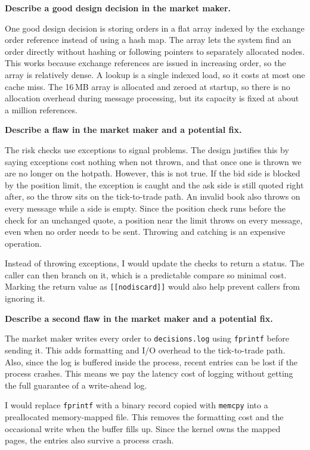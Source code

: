 \documentclass[11pt]{article}
\newcommand{\prompt}[1]{\par\medskip\noindent\textbf{#1}\par\smallskip\noindent\ignorespaces}
\begin{document}
\prompt{Describe a good design decision in the market maker.}

One good design decision is storing orders in a flat array indexed by the exchange order reference instead of using a hash map. The array lets the system find an order directly without hashing or following pointers to separately allocated nodes. This works because exchange references are issued in increasing order, so the array is relatively dense. A lookup is a single indexed load, so it costs at most one cache miss. The 16\,MB array is allocated and zeroed at startup, so there is no allocation overhead during message processing, but its capacity is fixed at about a million references.

\prompt{Describe a flaw in the market maker and a potential fix.}

The risk checks use exceptions to signal problems. The design justifies this by saying exceptions cost nothing when not thrown, and that once one is thrown we are no longer on the hotpath. However, this is not true. If the bid side is blocked by the position limit, the exception is caught and the ask side is still quoted right after, so the throw sits on the tick-to-trade path. An invalid book also throws on every message while a side is empty. Since the position check runs before the check for an unchanged quote, a position near the limit throws on every message, even when no order needs to be sent. Throwing and catching is an expensive operation.

Instead of throwing exceptions, I would update the checks to return a status. The caller can then branch on it, which is a predictable compare so minimal cost. Marking the return value as \texttt{[[nodiscard]]} would also help prevent callers from ignoring it.

\prompt{Describe a second flaw in the market maker and a potential fix.}

The market maker writes every order to \texttt{decisions.log} using \texttt{fprintf} before sending it. This adds formatting and I/O overhead to the tick-to-trade path. Also, since the log is buffered inside the process, recent entries can be lost if the process crashes. This means we pay the latency cost of logging without getting the full guarantee of a write-ahead log.

I would replace \texttt{fprintf} with a binary record copied with \texttt{memcpy} into a preallocated memory-mapped file. This removes the formatting cost and the occasional write when the buffer fills up. Since the kernel owns the mapped pages, the entries also survive a process crash.
\end{document}
